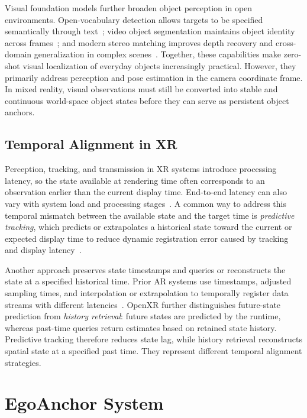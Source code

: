 \documentclass[review]{vgtc}
\begin{document}
Visual foundation models further broaden object perception in open environments. Open-vocabulary detection allows targets to be specified semantically through text~\cite{owlvit2022,glip2022,groundingdino2025,yoloe2025}; video object segmentation maintains object identity across frames~\cite{xmem2022,cutie2024}; and modern stereo matching improves depth recovery and cross-domain generalization in complex scenes~\cite{raftstereo2021,igevstereo2023,fastfoundationstereo2026}. Together, these capabilities make zero-shot visual localization of everyday objects increasingly practical. However, they primarily address perception and pose estimation in the camera coordinate frame. In mixed reality, visual observations must still be converted into stable and continuous world-space object states before they can serve as persistent object anchors.

\subsection{Temporal Alignment in XR}

Perception, tracking, and transmission in XR systems introduce processing latency, so the state available at rendering time often corresponds to an observation earlier than the current display time. End-to-end latency can also vary with system load and processing stages~\cite{diluca2010latency,mrloop2022,stauffert2020mtp}. A common way to address this temporal mismatch between the available state and the target time is \emph{predictive tracking}, which predicts or extrapolates a historical state toward the current or expected display time to reduce dynamic registration error caused by tracking and display latency~\cite{azuma1994improving,laviola2003double,pvt2023,yoon2022headmotion}.

Another approach preserves state timestamps and queries or reconstructs the state at a specified historical time. Prior AR systems use timestamps, adjusted sampling times, and interpolation or extrapolation to temporally register data streams with different latencies~\cite{jacobs1997latency}. OpenXR further distinguishes future-state prediction from \emph{history retrieval}: future states are predicted by the runtime, whereas past-time queries return estimates based on retained state history. Predictive tracking therefore reduces state lag, while history retrieval reconstructs spatial state at a specified past time. They represent different temporal alignment strategies.

\section{EgoAnchor System}\label{sec:system}
\end{document}
